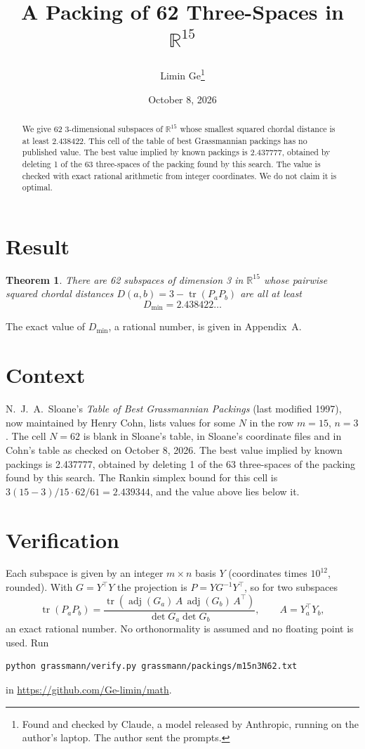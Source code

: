 \documentclass[11pt,a4paper]{article}
\title{A Packing of 62 Three-Spaces in $\mathbb{R}^{15}$}
\author{Limin Ge\thanks{Found and checked by Claude, a model released by Anthropic, running on the author's laptop. The author sent the prompts.}}
\date{October 8, 2026}
\newtheorem*{theorem}{Theorem}
\begin{document}
\maketitle
\begin{abstract}
We give 62 3-dimensional subspaces of $\mathbb{R}^{15}$ whose smallest squared chordal distance is at least 2.438422. This cell of the table of best Grassmannian packings has no published value. The best value implied by known packings is 2.437777, obtained by deleting 1 of the 63 three-spaces of the packing found by this search. The value is checked with exact rational arithmetic from integer coordinates. We do not claim it is optimal.
\end{abstract}

\section{Result}
\begin{theorem}
There are 62 subspaces of dimension 3 in $\mathbb{R}^{15}$ whose pairwise squared chordal distances $D(a,b) = 3 - \operatorname{tr}(P_aP_b)$ are all at least
\[ D_{\min} = 2.438422\ldots \]
\end{theorem}
The exact value of $D_{\min}$, a rational number, is given in Appendix~A.


\section{Context}
N.~J.~A.~Sloane's \emph{Table of Best Grassmannian Packings} (last modified 1997), now maintained by Henry Cohn, lists values for some $N$ in the row $m=15$, $n=3$. The cell $N=62$ is blank in Sloane's table, in Sloane's coordinate files and in Cohn's table as checked on October 8, 2026. The best value implied by known packings is 2.437777, obtained by deleting 1 of the 63 three-spaces of the packing found by this search. The Rankin simplex bound for this cell is $3(15-3)/15\cdot 62/61 = 2.439344$, and the value above lies below it.


\section{Verification}
Each subspace is given by an integer $m\times n$ basis $Y$ (coordinates times $10^{12}$, rounded). With $G=Y^\top Y$ the projection is $P=YG^{-1}Y^\top$, so for two subspaces
\[ \operatorname{tr}(P_aP_b)=\frac{\operatorname{tr}(\operatorname{adj}(G_a)\,A\,\operatorname{adj}(G_b)\,A^\top)}{\det G_a\det G_b},\qquad A=Y_a^\top Y_b, \]
an exact rational number. No orthonormality is assumed and no floating point is used. Run
\begin{verbatim}
python grassmann/verify.py grassmann/packings/m15n3N62.txt
\end{verbatim}
in \url{https://github.com/Ge-limin/math}.
\end{document}
